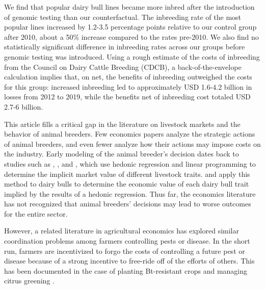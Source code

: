 \documentclass[12pt,letterpaper]{article}
\begin{document}
We find that popular dairy bull lines became more inbred after the introduction of genomic testing than our counterfactual.
The inbreeding rate of the most popular lines increased by 1.2-3.5 percentage points relative to our control group after 2010, about a 50\% increase compared to the rates pre-2010.
We also find no statistically significant difference in inbreeding rates across our groups before genomic testing was introduced.
Using a rough estimate of the costs of inbreeding from the Council on Dairy Cattle Breeding (CDCB), a back-of-the-envelope calculation implies that, on net, the benefits of inbreeding outweighed the costs for this group: increased inbreeding led to approximately USD 1.6-4.2 billion in losses from 2012 to 2019, while the benefits net of inbreeding cost totaled USD 2.7-6 billion.

This article fills a critical gap in the literature on livestock markets and the behavior of animal breeders.
Few economics papers analyze the strategic actions of animal breeders, and even fewer analyze how their actions may impose costs on the industry.
Early modeling of the animal breeder's decision dates back to studies such as \citet{ladd1978}, \citet{Kerr1984}, and \citet{Melton1994}, which use hedonic regression and linear programming to determine the implicit market value of different livestock traits.
\citet{Richards1996} and \citet{Schroeder1992} apply this method to dairy bulls to determine the economic value of each dairy bull trait implied by the results of a hedonic regression.
Thus far, the economics literature has not recognized that animal breeders' decisions may lead to worse outcomes for the entire sector.

However, a related literature in agricultural economics has explored similar coordination problems among farmers controlling pests or disease.
In the short run, farmers are incentivized to forgo the costs of controlling a future pest or disease because of a strong incentive to free-ride off of the efforts of others.
This has been documented in the case of planting Bt-resistant crops \citep{epanchin2015individual,brown2018voluntary,wechsler2018has,livingston2004managing} and managing citrus greening \citet{lence2023does}. 
\end{document}
